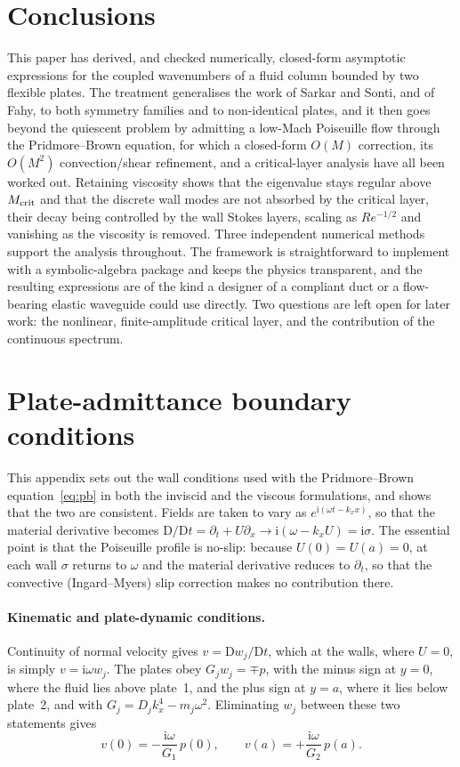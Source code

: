 \documentclass[11pt]{article}
\begin{document}
\section{Conclusions}
This paper has derived, and checked numerically, closed-form asymptotic expressions for the coupled
wavenumbers of a fluid column bounded by two flexible plates. The treatment generalises the work of
Sarkar and Sonti, and of Fahy, to both symmetry families and to non-identical plates, and it then goes
beyond the quiescent problem by admitting a low-Mach Poiseuille flow through the Pridmore--Brown
equation, for which a closed-form $O(M)$ correction, its $O(M^2)$ convection/shear refinement, and a
critical-layer analysis have all been worked out. Retaining viscosity shows that the eigenvalue stays
regular above $M_{\rm crit}$ and that the discrete wall modes are not absorbed by the critical layer,
their decay being controlled by the wall Stokes layers, scaling as $Re^{-1/2}$ and vanishing as the
viscosity is removed. Three independent numerical methods support the analysis throughout. The framework
is straightforward to implement with a symbolic-algebra package and keeps the physics transparent, and
the resulting expressions are of the kind a designer of a compliant duct or a flow-bearing elastic
waveguide could use directly. Two questions are left open for later work: the nonlinear,
finite-amplitude critical layer, and the contribution of the continuous spectrum.


\appendix
\section{Plate-admittance boundary conditions}\label{app:bc}
This appendix sets out the wall conditions used with the Pridmore--Brown equation~\eqref{eq:pb} in both
the inviscid and the viscous formulations, and shows that the two are consistent. Fields are taken to
vary as $e^{\mathrm{i}(\omega t-k_xx)}$, so that the material derivative becomes
$\mathrm{D}/\mathrm{D}t=\partial_t+U\partial_x\to\mathrm{i}(\omega-k_xU)=\mathrm{i}\sigma$. The essential
point is that the Poiseuille profile is no-slip: because $U(0)=U(a)=0$, at each wall $\sigma$ returns to
$\omega$ and the material derivative reduces to $\partial_t$, so that the convective (Ingard--Myers)
slip correction makes no contribution there.

\paragraph{Kinematic and plate-dynamic conditions.} Continuity of normal velocity gives
$v=\mathrm{D}w_j/\mathrm{D}t$, which at the walls, where $U=0$, is simply $v=\mathrm{i}\omega w_j$. The
plates obey $G_jw_j=\mp p$, with the minus sign at $y=0$, where the fluid lies above plate~1, and the
plus sign at $y=a$, where it lies below plate~2, and with $G_j=D_jk_x^4-m_j\omega^2$. Eliminating $w_j$
between these two statements gives
\begin{equation}
v(0)=-\frac{\mathrm{i}\omega}{G_1}\,p(0),\qquad v(a)=+\frac{\mathrm{i}\omega}{G_2}\,p(a).
\label{eq:adm}
\end{equation}
\end{document}
